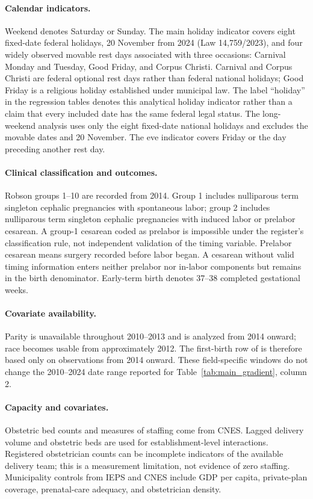 \paragraph{Calendar indicators.} Weekend denotes Saturday or Sunday. The main holiday indicator covers eight fixed-date federal holidays, 20 November from 2024 (Law 14,759/2023), and four widely observed movable rest days associated with three occasions: Carnival Monday and Tuesday, Good Friday, and Corpus Christi. Carnival and Corpus Christi are federal optional rest days rather than federal national holidays; Good Friday is a religious holiday established under municipal law. The label ``holiday'' in the regression tables denotes this analytical holiday indicator rather than a claim that every included date has the same federal legal status. The long-weekend analysis uses only the eight fixed-date national holidays and excludes the movable dates and 20 November. The eve indicator covers Friday or the day preceding another rest day.

\paragraph{Clinical classification and outcomes.} Robson groups 1--10 are recorded from 2014. Group 1 includes nulliparous term singleton cephalic pregnancies with spontaneous labor; group 2 includes nulliparous term singleton cephalic pregnancies with induced labor or prelabor cesarean. A group-1 cesarean coded as prelabor is impossible under the register's classification rule, not independent validation of the timing variable. Prelabor cesarean means surgery recorded before labor began. A cesarean without valid timing information enters neither prelabor nor in-labor components but remains in the birth denominator. Early-term birth denotes 37--38 completed gestational weeks.

\paragraph{Covariate availability.} Parity is unavailable throughout 2010--2013 and is analyzed from 2014 onward; race becomes usable from approximately 2012. The first-birth row of  is therefore based only on observations from 2014 onward. These field-specific windows do not change the 2010--2024 date range reported for Table~\ref{tab:main_gradient}, column 2.

\paragraph{Capacity and covariates.} Obstetric bed counts and measures of staffing come from CNES. Lagged delivery volume and obstetric beds are used for establishment-level interactions. Registered obstetrician counts can be incomplete indicators of the available delivery team; this is a measurement limitation, not evidence of zero staffing. Municipality controls from IEPS and CNES include GDP per capita, private-plan coverage, prenatal-care adequacy, and obstetrician density.

